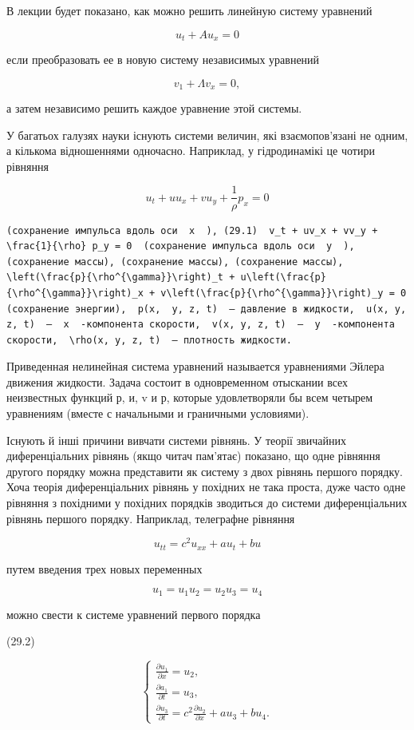 \documentclass[
  ukrainian,
]{article}
\begin{document}
В лекции будет показано, как можно решить линейную систему уравнений

\[
u_t + Au_x = 0
\]

если преобразовать ее в новую систему независимых уравнений

\[
v_1 + \Lambda v_x = 0,
\]

а затем независимо решить каждое уравнение этой системы.

У багатьох галузях науки існують системи величин, які взаємопов'язані не
одним, а кількома відношеннями одночасно. Наприклад, у гідродинамікі це
чотири рівняння

\[
u_t + uu_x + vu_y + \frac{1}{\rho} p_x = 0
\]

\begin{verbatim}
(сохранение импульса вдоль оси  x  ), (29.1)  v_t + uv_x + vv_y + \frac{1}{\rho} p_y = 0  (сохранение импульса вдоль оси  y  ), (сохранение массы), (сохранение массы), (сохранение массы),  \left(\frac{p}{\rho^{\gamma}}\right)_t + u\left(\frac{p}{\rho^{\gamma}}\right)_x + v\left(\frac{p}{\rho^{\gamma}}\right)_y = 0  (сохранение энергии),  p(x,  y, z, t)  — давление в жидкости,  u(x, y, z, t)  —  x  -компонента скорости,  v(x, y, z, t)  —  y  -компонента скорости,  \rho(x, y, z, t)  — плотность жидкости.
\end{verbatim}

Приведенная нелинейная система уравнений называется уравнениями Эйлера
движения жидкости. Задача состоит в одновременном отыскании всех
неизвестных функций р, и, v и р, которые удовлетворяли бы всем четырем
уравнениям (вместе с начальными и граничными условиями).

Існують й інші причини вивчати системи рівнянь. У теорії звичайних
диференціальних рівнянь (якщо читач пам'ятає) показано, що одне рівняння
другого порядку можна представити як систему з двох рівнянь першого
порядку. Хоча теорія диференціальних рівнянь у похідних не така проста,
дуже часто одне рівняння з похідними у похідних порядків зводиться до
системи диференціальних рівнянь першого порядку. Наприклад, телеграфне
рівняння

\[
u_{tt} = c^2 u_{xx} + a u_t + b u
\]

путем введения трех новых переменных

\[
u_1 = u_1
u_2 = u_2
u_3 = u_4
\]

можно свести к системе уравнений первого порядка

(29.2)

\[
\begin{cases} \frac{\partial u_1}{\partial x} = u_2, \\ \frac{\partial a_1}{\partial t} = u_3, \\ \frac{\partial u_3}{\partial t} = c^2 \frac{\partial u_2}{\partial x} + au_3 + bu_4. \end{cases}
\]
\end{document}
